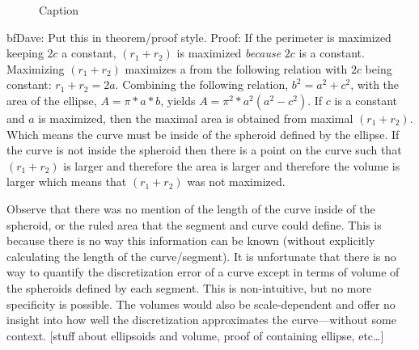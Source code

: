 \begin{figure}[h!]
  \caption{\label{EllipseGeometry} Caption}
\end{figure}

{bf{Dave:  Put this in theorem/proof style.}}
Proof: If the perimeter is maximized keeping $2c$ a constant, $(r_1 + r_2)$ is maximized \textit{because} $2c$ is a constant.  Maximizing $(r_1+r_2)$ maximizes a from the following relation with $2c$ being constant: $r_1 + r_2 = 2a$.  Combining the following relation, $b^2 = a^2 + c^2$, with the area of the ellipse, $A = \pi * a * b$, yields $A=\pi^{2}*a^{2}(a^{2} - c^2)$.  If $c$ is a constant and $a$ is maximized, then the maximal area is obtained from maximal $(r_1+r_2)$.  Which means the curve must be inside of the spheroid defined by the ellipse.  If the curve is not inside the spheroid then there is a point on the curve such that $(r_1+r_2)$ is larger and therefore the area is larger and therefore the volume is larger which means that $(r_1+r_2)$ was not maximized.

        Observe that there was no mention of the length of the curve inside of the spheroid, or the ruled area that the segment and curve could define.  This is because there is no way this information can be known (without explicitly calculating the length of the curve/segment).  It is unfortunate that there is no way to quantify the discretization error of a curve except in terms of volume of the spheroids defined by each segment.  This is non-intuitive, but no more specificity is possible.  The volumes would also be scale-dependent and offer no insight into how well the discretization approximates the curve—without some context.
[stuff about ellipsoids and volume, proof of containing ellipse, etc…]

